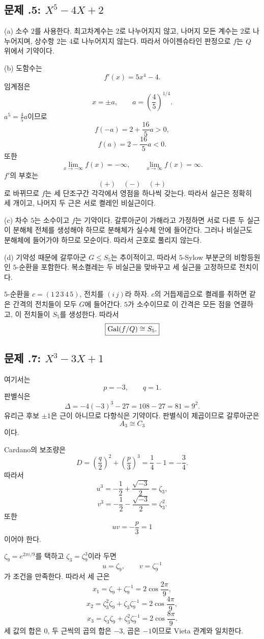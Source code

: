 \subsection*{문제 \thechapter.5: $X^5-4X+2$}

\begin{solution}
(a) 소수 $2$를 사용한다. 최고차계수는 $2$로 나누어지지 않고, 나머지 모든 계수는 $2$로 나누어지며, 상수항 $2$는 $4$로 나누어지지 않는다. 따라서 아이젠슈타인 판정으로 $f$는 $Q$ 위에서 기약이다.

(b) 도함수는
\[
  f'(x)=5x^4-4.
\]
임계점은
\[
  x=\pm a,
  \qquad
  a=\left(\frac45\right)^{1/4}.
\]
$a^5=\frac45a$이므로
\[
  f(-a)=2+\frac{16}{5}a>0,
\]
\[
  f(a)=2-\frac{16}{5}a<0.
\]
또한
\[
  \lim_{x\to-\infty}f(x)=-\infty,
  \qquad
  \lim_{x\to\infty}f(x)=\infty.
\]
$f'$의 부호는
\[
  (+)\quad(-)\quad(+)
\]
로 바뀌므로 $f$는 세 단조구간 각각에서 영점을 하나씩 갖는다. 따라서 실근은 정확히 세 개이고, 나머지 두 근은 서로 켤레인 비실근이다.

(c) 차수 $5$는 소수이고 $f$는 기약이다. 갈루아군이 가해라고 가정하면 서로 다른 두 실근이 분해체 전체를 생성해야 하므로 분해체가 실수체 안에 들어간다. 그러나 비실근도 분해체에 들어가야 하므로 모순이다. 따라서 근호로 풀리지 않는다.

(d) 기약성 때문에 갈루아군 $G\le S_5$는 추이적이고, 따라서 $5$-Sylow 부분군의 비항등원인 $5$-순환을 포함한다. 복소켤레는 두 비실근을 맞바꾸고 세 실근을 고정하므로 전치이다.

$5$-순환을 $c=(1\,2\,3\,4\,5)$, 전치를 $(i\,j)$라 하자. $c$의 거듭제곱으로 켤레를 취하면 같은 간격의 전치들이 모두 $G$에 들어간다. $5$가 소수이므로 이 간격은 모든 점을 연결하고, 이 전치들이 $S_5$를 생성한다. 따라서
\[
  \boxed{\operatorname{Gal}(f/Q)\cong S_5.}
\]
\end{solution}

\subsection*{문제 \thechapter.7: $X^3-3X+1$}

\begin{solution}
여기서는
\[
  p=-3,\qquad q=1.
\]
판별식은
\[
  \Delta=-4(-3)^3-27=108-27=81=9^2.
\]
유리근 후보 $\pm1$은 근이 아니므로 다항식은 기약이다. 판별식이 제곱이므로 갈루아군은
\[
  A_3\cong C_3
\]
이다.

Cardano의 보조량은
\[
  D=\left(\frac q2\right)^2+\left(\frac p3\right)^3
  =\frac14-1=-\frac34.
\]
따라서
\[
  u^3=-\frac12+\frac{\sqrt{-3}}2=\zeta_3,
\]
\[
  v^3=-\frac12-\frac{\sqrt{-3}}2=\zeta_3^2.
\]
또한
\[
  uv=-\frac p3=1
\]
이어야 한다.

$\zeta_9=e^{2\pi i/9}$를 택하고 $\zeta_3=\zeta_9^3$이라 두면
\[
  u=\zeta_9,\qquad v=\zeta_9^{-1}
\]
가 조건을 만족한다. 따라서 세 근은
\[
  x_1=\zeta_9+\zeta_9^{-1}
  =2\cos\frac{2\pi}{9},
\]
\[
  x_2=\zeta_3^2\zeta_9+\zeta_3\zeta_9^{-1}
  =2\cos\frac{4\pi}{9},
\]
\[
  x_3=\zeta_3\zeta_9+\zeta_3^2\zeta_9^{-1}
  =2\cos\frac{8\pi}{9}.
\]
세 값의 합은 $0$, 두 근씩의 곱의 합은 $-3$, 곱은 $-1$이므로 Vieta 관계와 일치한다.
\end{solution}

